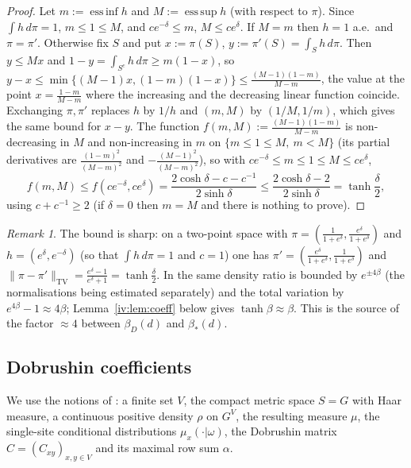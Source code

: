 \documentclass[11pt,a4paper]{article}
\theoremstyle{definition}
\theoremstyle{remark}
\newtheorem{remark}[theorem]{Remark}
\newcommand{\norm}[1]{\lVert #1\rVert}
\newcommand{\TV}{\mathrm{TV}}
\newcommand{\Fref}[3]{\cite[#1~`#2' (\texttt{#3})]{F}}
\newcommand{\Flab}[2]{\cite[#1 \texttt{#2}]{F}}
\newcommand{\bS}{\beta_*}
\begin{document}
\begin{proof}
Let $m:=\operatorname{ess\,inf}h$ and $M:=\operatorname{ess\,sup}h$ (with respect to $\pi$). Since $\int h\,d\pi=1$, $m\le1\le M$,
and $ce^{-\delta}\le m$, $M\le ce^\delta$. If $M=m$ then $h=1$ a.e.\ and $\pi=\pi'$. Otherwise fix $S$ and put $x:=\pi(S)$,
$y:=\pi'(S)=\int_Sh\,d\pi$. Then $y\le Mx$ and $1-y=\int_{S^c}h\,d\pi\ge m(1-x)$, so
$y-x\le\min\{(M-1)x,(1-m)(1-x)\}\le\frac{(M-1)(1-m)}{M-m}$, the value at the point $x=\frac{1-m}{M-m}$ where the increasing and
the decreasing linear function coincide. Exchanging $\pi,\pi'$ replaces $h$ by $1/h$ and $(m,M)$ by $(1/M,1/m)$, which gives the
same bound for $x-y$. The function $f(m,M):=\frac{(M-1)(1-m)}{M-m}$ is non-decreasing in $M$ and non-increasing in $m$ on
$\{m\le1\le M,\ m<M\}$ (its partial derivatives are $\frac{(1-m)^2}{(M-m)^2}$ and $-\frac{(M-1)^2}{(M-m)^2}$), so with
$c e^{-\delta}\le m\le1\le M\le ce^\delta$,
\[
f(m,M)\le f(ce^{-\delta},ce^{\delta})=\frac{2\cosh\delta-c-c^{-1}}{2\sinh\delta}\le\frac{2\cosh\delta-2}{2\sinh\delta}=\tanh\frac\delta2,
\]
using $c+c^{-1}\ge2$ (if $\delta=0$ then $m=M$ and there is nothing to prove).
\end{proof}

\begin{remark}
The bound is sharp: on a two-point space with $\pi=(\frac1{1+e^\delta},\frac{e^\delta}{1+e^\delta})$ and $h=(e^{\delta},e^{-\delta})$
(so that $\int h\,d\pi=1$ and $c=1$) one has $\pi'=(\frac{e^\delta}{1+e^\delta},\frac1{1+e^\delta})$ and
$\norm{\pi-\pi'}_\TV=\frac{e^\delta-1}{e^\delta+1}=\tanh\frac\delta2$. In \Flab{Lemma}{lem:dobrushinbound} the same density ratio
is bounded by $e^{\pm4\beta}$ (the normalisations being estimated separately) and the total variation by $e^{4\beta}-1\approx4\beta$;
Lemma~\ref{iv:lem:coeff} below gives $\tanh\beta\approx\beta$. This is the source of the factor $\approx4$ between $\beta_D(d)$ and
$\bS(d)$.
\end{remark}

\subsection{Dobrushin coefficients}

We use the notions of \Fref{Definition}{Finite spin system}{def:spin}: a finite set $V$, the compact metric space $S=G$ with
Haar measure, a continuous positive density $\rho$ on $G^V$, the resulting measure $\mu$, the single-site conditional
distributions $\mu_x(\cdot|\omega)$, the Dobrushin matrix $C=(C_{xy})_{x,y\in V}$ and its maximal row sum $\alpha$.
\end{document}

